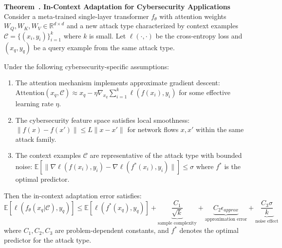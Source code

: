 \documentclass[journal]{IEEEtran}
\newcounter{theorem}
\newenvironment{theorem}[1][]{\refstepcounter{theorem}\par\medskip
   \noindent \textbf{Theorem~\thetheorem. #1} \rmfamily}{\medskip}
\begin{document}
\begin{theorem}[In-Context Adaptation for Cybersecurity Applications]
\label{thm:icl_adaptation}
Consider a meta-trained single-layer transformer $f_\theta$ with attention weights $W_Q, W_K, W_V \in \mathbb{R}^{d \times d}$ and a new attack type characterized by context examples $\mathcal{C} = \{(x_i, y_i)\}_{i=1}^k$ where $k$ is small. Let $\ell(\cdot, \cdot)$ be the cross-entropy loss and $(x_q, y_q)$ be a query example from the same attack type.

Under the following cybersecurity-specific assumptions:
\begin{enumerate}
\item The attention mechanism implements approximate gradient descent: $\text{Attention}(x_q, \mathcal{C}) \approx x_q - \eta \nabla_{x_q} \sum_{i=1}^k \ell(f(x_i), y_i)$ for some effective learning rate $\eta$.
\item The cybersecurity feature space satisfies local smoothness: $\|f(x) - f(x')\| \leq L\|x - x'\|$ for network flows $x, x'$ within the same attack family.
\item The context examples $\mathcal{C}$ are representative of the attack type with bounded noise: $\mathbb{E}[\|\nabla \ell(f(x_i), y_i) - \nabla \ell(f^*(x_i), y_i)\|] \leq \sigma$ where $f^*$ is the optimal predictor.
\end{enumerate}

Then the in-context adaptation error satisfies:
\begin{equation}
\mathbb{E}[\ell(f_\theta(x_q | \mathcal{C}), y_q)] \leq \mathbb{E}[\ell(f^*(x_q), y_q)] + \underbrace{\frac{C_1}{\sqrt{k}}}_{\text{sample complexity}} + \underbrace{C_2 \epsilon_{approx}}_{\text{approximation error}} + \underbrace{\frac{C_3 \sigma}{k}}_{\text{noise effect}}
\end{equation}
where $C_1, C_2, C_3$ are problem-dependent constants, and $f^*$ denotes the optimal predictor for the attack type.
\end{theorem}
\end{document}
